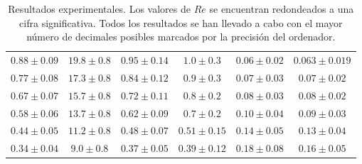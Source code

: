 \begin{table*}[t]
\begin{tabular}{cccccc}
$0.88 \pm 0.09$   &   $19.8 \pm 0.8$   &   $0.95 \pm 0.14$   &   $1.0 \pm 0.3$   &   $0.06 \pm 0.02$   &   $0.063 \pm 0.019$  \\
$0.77 \pm 0.08$   &   $17.3 \pm 0.8$   &   $0.84 \pm 0.12$   &   $0.9 \pm 0.3$   &   $0.07 \pm 0.03$   &   $0.07 \pm 0.02$  \\
$0.67 \pm 0.07$   &   $15.7 \pm 0.8$   &   $0.72 \pm 0.11$   &   $0.8 \pm 0.2$   &   $0.08 \pm 0.03$   &   $0.08 \pm 0.02$  \\
$0.58 \pm 0.06$   &   $13.7 \pm 0.8$   &   $0.62 \pm 0.09$   &   $0.7 \pm 0.2$   &   $0.10 \pm 0.04$   &   $0.09 \pm 0.03$  \\
$0.44 \pm 0.05$   &   $11.2 \pm 0.8$   &   $0.48 \pm 0.07$   &   $0.51 \pm 0.15$   &   $0.14 \pm 0.05$   &   $0.13 \pm 0.04$  \\
$0.34 \pm 0.04$   &   $9.0 \pm 0.8$    &   $0.37 \pm 0.05$   &   $0.39 \pm 0.12$   &   $0.18 \pm 0.08$   &   $0.16 \pm 0.05$  \\
			\bottomrule
		\end{tabular}
		\caption{Resultados experimentales. Los valores de $Re$ se encuentran redondeados a una cifra significativa. Todos los resultados se han llevado a cabo con el mayor número de decimales posibles marcados por la precisión del ordenador.}
		\label{table_exp}
\end{table*}